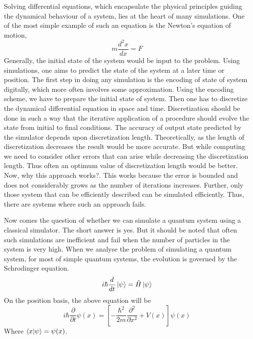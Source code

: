 \documentclass[12pt,a4paper]{report}
\begin{document}
Solving differential equations, which encapsulate the physical principles guiding the dynamical behaviour of a system, lies at the heart of many simulations. One of the most simple example of such an equation is the Newton's equation of motion,
\begin{equation}
m\frac{d^{2}x}{dx} = F
\end{equation}
Generally, the initial state of the system would be input to the problem. Using simulations, one aims to predict the state of the system at a later time or position. The first step in doing any simulation is the encoding of state of system digitally, which more often involves some approximation. Using the encoding scheme, we have to prepare the initial state of system. Then one has to discretize the dynamical differential equation in space and time. Discretization should be done in such a way that the iterative application of a procedure should evolve the state from initial to final conditions. The accuracy of output state predicted by the simulator depends upon discretization length. Theoretically, as the length of discretization decreases the result would be more accurate. But while computing we need to consider other errors that can arise while decreasing the discretization length. Thus often an optimum value of discretization length would be better. Now, why this approach works?. This works because the error is bounded and does not considerably grows as the number of iterations increases. Further, only those system that can be efficiently described can be simulated efficiently. Thus, there are systems where such an approach fails.\par
Now comes the question of whether we can simulate a quantum system using a classical simulator. The short answer is yes. But it should be noted that often such simulations are inefficient and fail when the number of particles in the system is very high.  When we analyse the problem of simulating a quantum system, for most of simple quantum systems, the evolution is governed by the Schrodinger equation. 
\begin{equation}
i\hbar \frac{d}{dt}\ket{\psi} = \hat{H} \ket{\psi}
\end{equation}
On the position basis, the above equation will be 
\begin{equation}
i\hbar\frac{\partial}{\partial t}\psi(x)= \left[ -\frac{\hbar^{2}}{2m}\frac{\partial^{2}}{\partial x^{2}}+V(x)\right] \psi(x)
\end{equation}
Where $\braket{x|\psi} = \psi(x)$.\par
\end{document}
